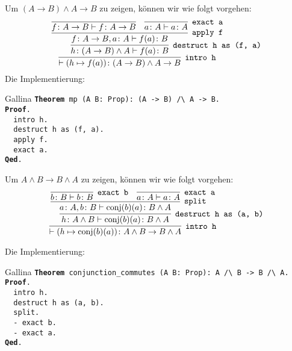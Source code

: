 \documentclass[8pt]{beamer}
\newcommand{\cond}{\rightarrow}
\newcommand{\kw}[1]{\textbf{#1}}
\begin{document}
\begin{frame}
Um $(A\cond B)\land A\cond B$ zu zeigen, können wir wie folgt vorgehen:
\[\infer[\texttt{intro h}]{\vdash (h\mapsto f(a))\colon (A\to B)\land A\to B}{
  \infer[\texttt{destruct h as (f, a)}]{h\colon (A\to B)\land A\vdash f(a)\colon B}{
    \infer[\texttt{apply f}]{f\colon A\to B, a\colon A\vdash f(a)\colon B}{
      \infer{f\colon A\to B\vdash f\colon A\to B}{}
    & \infer[\texttt{exact a}]{a\colon A\vdash a\colon A}{}
    }
  }
}\]\pause
Die Implementierung:
\begin{block}{Gallina}
\texttt{\kw{Theorem} mp (A B: Prop): (A -> B) /{\textbackslash} A -> B.\\
\kw{Proof}.\\
\ \ intro h.\\
\ \ destruct h as (f, a).\\
\ \ apply f.\\
\ \ exact a.\\
\kw{Qed}.}
\end{block}
\end{frame}

\begin{frame}
Um $A\land B\cond B\land A$ zu zeigen, können wir wie folgt vorgehen:
\[\infer[\texttt{intro h}]{\vdash (h\mapsto \mathrm{conj}(b)(a))\colon A\land B\to B\land A}{
  \infer[\texttt{destruct h as (a, b)}]{h\colon A\land B\vdash\mathrm{conj}(b)(a)\colon B\land A}{
    \infer[\texttt{split}]{a\colon A, b\colon B\vdash\mathrm{conj}(b)(a)\colon B\land A}{
      \infer[\texttt{exact b}]{b\colon B\vdash b\colon B}{}
    & \infer[\texttt{exact a}]{a\colon A\vdash a\colon A}{}
    }
  }
}\]\pause

Die Implementierung:
\begin{block}{Gallina}
\texttt{\kw{Theorem} conjunction\_commutes (A B: Prop): A /{\textbackslash} B -> B /{\textbackslash} A.\\
\kw{Proof}.\\
\ \ intro h.\\
\ \ destruct h as (a, b).\\
\ \ split.\\
\ \ - exact b.\\
\ \ - exact a.\\
\kw{Qed}.}
\end{block}
\end{frame}
\end{document}

